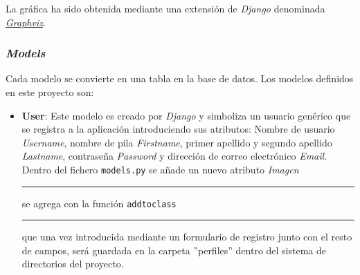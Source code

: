\documentclass[a4paper, 12pt]{book}
\begin{document}
La gr\'afica ha sido obtenida mediante una extensi\'on de \textit{Django} denominada 
\href{https://code.djangoproject.com/wiki/DjangoGraphviz}{\textit{Graphviz}}.

\subsubsection{\textit{Models}} 
\label{sec:models}
Cada modelo se convierte en una tabla en la base de datos. Los modelos definidos en este proyecto son:

\begin{itemize}
  \item {\bfseries User}: Este modelo es creado por \textit{Django} y simboliza un usuario gen\'erico que se registra a la aplicaci\'on introduciendo sus 
  atributos: Nombre de usuario \textit{Username}, nombre de pila \textit{Firstname}, primer apellido y segundo apellido \textit{Lastname}, contrase\~na 
  \textit{Password} 
  y direcci\'on de correo electr\'onico \textit{Email}. Dentro del fichero \texttt{models.py} se a\~nade un nuevo atributo \textit{Imagen} 
  \rule[1mm]{4mm}{0.1mm}se agrega con la funci\'on \texttt{addtoclass}\rule[1mm]{4mm}{0.1mm} que una vez introducida mediante un formulario de registro 
  junto con el resto de campos, ser\'a guardada en la carpeta ''perfiles'' dentro del sistema de directorios del proyecto. 
  

\end{itemize}
\end{document}
